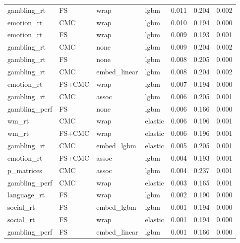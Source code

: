 \documentclass{article}
\begin{document}
\begin{longtable}{llllrrr}
	gambling\_rt & FS & wrap & lgbm & 0.011 & 0.204 & 0.002 \\
	emotion\_rt & CMC & wrap & lgbm & 0.010 & 0.194 & 0.000 \\
	emotion\_rt & FS & wrap & lgbm & 0.009 & 0.193 & 0.001 \\
	gambling\_rt & CMC & none & lgbm & 0.009 & 0.204 & 0.002 \\
	gambling\_rt & FS & none & lgbm & 0.008 & 0.205 & 0.000 \\
	gambling\_rt & CMC & embed\_linear & lgbm & 0.008 & 0.204 & 0.002 \\
	emotion\_rt & FS+CMC & wrap & lgbm & 0.007 & 0.194 & 0.000 \\
	gambling\_rt & CMC & assoc & lgbm & 0.006 & 0.205 & 0.001 \\
	gambling\_perf & FS & none & lgbm & 0.006 & 0.166 & 0.000 \\
	wm\_rt & CMC & wrap & elastic & 0.006 & 0.196 & 0.001 \\
	wm\_rt & FS+CMC & wrap & elastic & 0.006 & 0.196 & 0.001 \\
	gambling\_rt & CMC & embed\_lgbm & elastic & 0.005 & 0.205 & 0.001 \\
	emotion\_rt & FS+CMC & assoc & lgbm & 0.004 & 0.193 & 0.001 \\
	p\_matrices & CMC & assoc & lgbm & 0.004 & 0.237 & 0.001 \\
	gambling\_perf & CMC & wrap & elastic & 0.003 & 0.165 & 0.001 \\
	language\_rt & FS & wrap & lgbm & 0.002 & 0.190 & 0.000 \\
	social\_rt & FS & embed\_lgbm & lgbm & 0.001 & 0.194 & 0.000 \\
	social\_rt & FS & wrap & elastic & 0.001 & 0.194 & 0.000 \\
	gambling\_perf & FS & embed\_linear & lgbm & 0.001 & 0.166 & 0.000 \\
\end{longtable}


\end{document}
